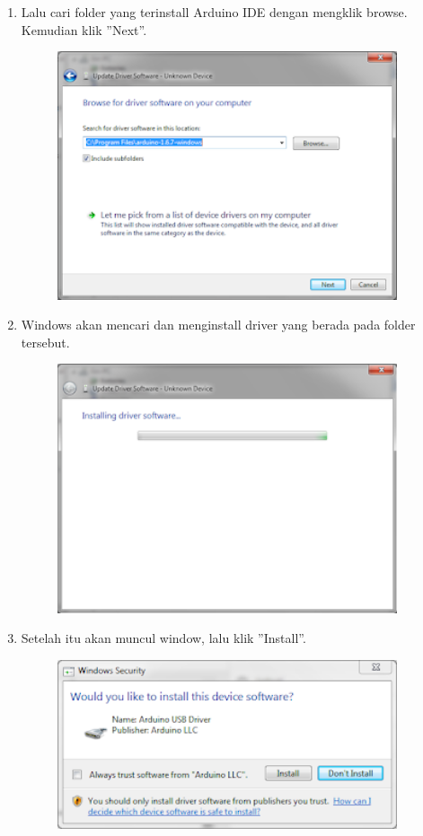\begin{enumerate}
\begin{figure}[H]
		\centering
	\end{figure}
	\item Lalu cari folder yang terinstall Arduino IDE dengan mengklik browse. Kemudian klik ''Next''.
	\begin{figure}[H]
		\includegraphics[width=10cm]{figures/5/1174006/Teori/7.png}
		\centering
	\end{figure}
	\item Windows akan mencari dan menginstall driver yang berada pada folder tersebut.
	\begin{figure}[H]
		\includegraphics[width=10cm]{figures/5/1174006/Teori/8.png}
		\centering
	\end{figure}
	\item Setelah itu akan muncul window, lalu klik ''Install''.
	\begin{figure}[H]
		\includegraphics[width=10cm]{figures/5/1174006/Teori/9.png}

\end{figure}
\end{enumerate}
